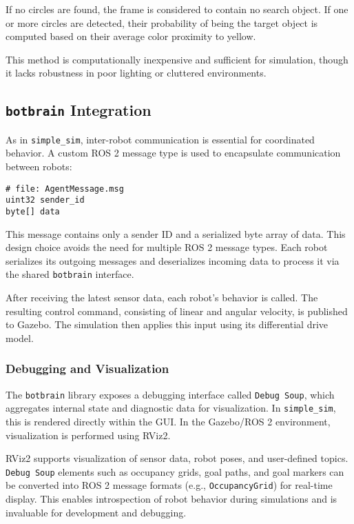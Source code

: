 If no circles are found, the frame is considered to contain no search object. If one or more circles are detected, their probability of being the target object is computed based on their average color proximity to yellow.

This method is computationally inexpensive and sufficient for simulation, though it lacks robustness in poor lighting or cluttered environments.

\subsection{\texttt{botbrain} Integration}
\label{sub:Botbrain_integration}
As in \texttt{simple\_sim}, inter-robot communication is essential for coordinated behavior. A custom ROS 2 message type is used to encapsulate communication between robots:

\begin{verbatim}
# file: AgentMessage.msg
uint32 sender_id
byte[] data
\end{verbatim}

This message contains only a sender ID and a serialized byte array of data. This design choice avoids the need for multiple ROS 2 message types. Each robot serializes its outgoing messages and deserializes incoming data to process it via the shared \texttt{botbrain} interface.

After receiving the latest sensor data, each robot's behavior is called. The resulting control command, consisting of linear and angular velocity, is published to Gazebo. The simulation then applies this input using its differential drive model.

\subsubsection{Debugging and Visualization}
\label{sec:debugging_rviz}
The \texttt{botbrain} library exposes a debugging interface called \texttt{Debug Soup}, which aggregates internal state and diagnostic data for visualization. In \texttt{simple\_sim}, this is rendered directly within the GUI. In the Gazebo/ROS 2 environment, visualization is performed using RViz2.

RViz2 supports visualization of sensor data, robot poses, and user-defined topics. \texttt{Debug Soup} elements such as occupancy grids, goal paths, and goal markers can be converted into ROS 2 message formats (e.g., \texttt{OccupancyGrid}) for real-time display. This enables introspection of robot behavior during simulations and is invaluable for development and debugging.

